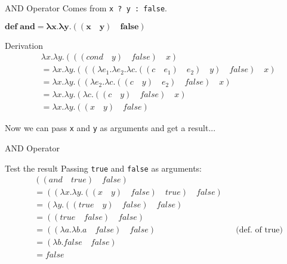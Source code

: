 \documentclass{beamer}
\begin{document}
\begin{frame}{AND Operator}
Comes from \texttt{x ? y : false}.
\begin{framed} $\mathbf{def \; and = \lambda x . \lambda y . ((x \quad y) \quad false)}$ \end{framed}
\begin{block}{Derivation}
\begin{align*}
	&\lambda x . \lambda y . (((cond \quad y) \quad false) \quad x) \\
    &= \lambda x . \lambda y . (((\lambda e_1 . \lambda e_2 . \lambda c . ((c \quad e_1) \quad e_2) \quad y) \quad false) \quad x) \\
    &= \lambda x . \lambda y . ((\lambda e_2 . \lambda c . ((c \quad y) \quad e_2) \quad false) \quad x) \\
    &= \lambda x . \lambda y . (\lambda c . ((c \quad y) \quad false) \quad x) \\
    &= \lambda x . \lambda y . ((x \quad y) \quad false)
\end{align*}
\end{block}
Now we can pass \texttt{x} and \texttt{y} as arguments and get a result...
\end{frame}

\begin{frame}{AND Operator}
\begin{block}{Test the result}
Passing \texttt{true} and \texttt{false} as arguments:
\begin{align*}
    &((and \quad true) \quad false) && \\
    &= ((\lambda x . \lambda y . ((x \quad y) \quad false) \quad true) \quad false) &&\\
    &= (\lambda y . ((true \quad y) \quad false) \quad false) &&\\
    &= ((true \quad false) \quad false) &&\\
    &= ((\lambda a . \lambda b . a \quad false) \quad false) && \text{(def. of true)}\\
    &= (\lambda b . false \quad false) &&\\
    &= false &&
\end{align*}
\end{block}
\end{frame}
\end{document}
